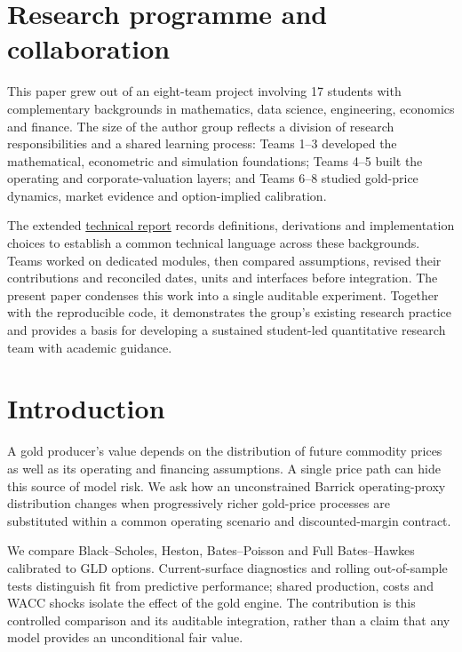 \section*{Research programme and collaboration}
This paper grew out of an eight-team project involving 17 students with complementary backgrounds in mathematics, data science, engineering, economics and finance. The size of the author group reflects a division of research responsibilities and a shared learning process: Teams 1--3 developed the mathematical, econometric and simulation foundations; Teams 4--5 built the operating and corporate-valuation layers; and Teams 6--8 studied gold-price dynamics, market evidence and option-implied calibration.

The extended \href{https://raw.githubusercontent.com/StartingFinanceClubPoliTo/Research/main/Barrick-Gold/Barrick\%20Mining\%20UNIFICATO/thesis/Articolo.pdf}{technical report} records definitions, derivations and implementation choices to establish a common technical language across these backgrounds. Teams worked on dedicated modules, then compared assumptions, revised their contributions and reconciled dates, units and interfaces before integration. The present paper condenses this work into a single auditable experiment. Together with the reproducible code, it demonstrates the group's existing research practice and provides a basis for developing a sustained student-led quantitative research team with academic guidance.

\section{Introduction}
A gold producer's value depends on the distribution of future commodity prices as well as its operating and financing assumptions. A single price path can hide this source of model risk. We ask how an unconstrained Barrick operating-proxy distribution changes when progressively richer gold-price processes are substituted within a common operating scenario and discounted-margin contract.

We compare Black--Scholes, Heston, Bates--Poisson and Full Bates--Hawkes calibrated to GLD options. Current-surface diagnostics and rolling out-of-sample tests distinguish fit from predictive performance; shared production, costs and WACC shocks isolate the effect of the gold engine. The contribution is this controlled comparison and its auditable integration, rather than a claim that any model provides an unconditional fair value.
